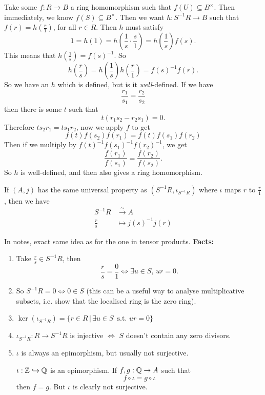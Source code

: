 \documentclass{article}
\begin{document}
\proof Take some $f : R \to B$ a ring homomorphism such that $f(U) \subseteq B^{\times}$. Then immediately, we know $f(S) \subseteq B^{\times}$. Then we want $h: S^{-1}R \to B$ such that $f(r) = h\left(\frac{r}{1}\right)$, for all $r \in R$. \gap Then $h$ must satisfy \[ 1=h(1)=h\left(\frac{1}{s} \cdot \frac{s}{1}\right) = h\left(\frac{1}{s}\right)f(s).\]
This means that $h\left(\frac{1}{s}\right) = f(s)^{-1}$. So \[ h\left(\frac{r}{s}\right)=h\left(\frac{1}{s}\right)h\left(\frac{r}{1}\right)=f(s)^{-1}f(r).\] So we have an $h$ which is defined, but is it \textit{well}-defined. If we have \[ \frac{r_{1}}{s_{1}}=\frac{r_{2}}{s_{2}}\] then there is some $t$ such that \[ t(r_{1}s_{2}-r_{2}s_{1}) = 0.\] Therefore $ts_{2}r_{1}=ts_{1}r_{2}$, now we apply $f$ to get \[ f(t)f(s_{2})f(r_{1})=f(t)f(s_{1})f(r_{2}) \] Then if we multiply by $f(t)^{-1}f(s_{1})^{-1}f(r_{2})^{-1}$, we get \[ \frac{f(r_{1})}{f(s_{1})}=\frac{f(r_{2})}{f(s_{2})}.\]
So $h$ is well-defined, and then also gives a ring homomorphism. \endproof
\begin{fancyprop}{}
    If $(A,j)$ has the same universal property as $(S^{-1}R, \iota_{S^{-1}R})$ where $\iota$ maps $r$ to $\frac{r}{1}$, then we have \begin{align*}
        S^{-1}R &\xrightarrow{\sim} A\\
        \frac{r}{s} &\mapsto j(s)^{-1}j(r)
    \end{align*}
\end{fancyprop}
\proof In notes, exact same idea as for the one in tensor products. \endproof \newpage
\textbf{Facts:} \begin{enumerate}
    \item Take $\frac{r}{s} \in S^{-1}R$, then \[ \frac{r}{s} = \frac{0}{1} \Leftrightarrow \exists u \in S, \, ur=0.\]
    \item So $S^{-1}R = 0 \Leftrightarrow 0 \in S$ (this can be a useful way to analyse multiplicative subsets, i.e. show that the localised ring is the zero ring).
    \item $\ker(\iota_{S^{-1}R}) = \{ r \in R \, | \, \exists u \in S \, \text{ s.t. } ur = 0\}$
    \item $\iota_{S^{-1}R} : R \to S^{-1}R$ is injective $\Leftrightarrow$ $S$ doesn't contain any zero divisors.
    \item $\iota$ is always an epimorphism, but usually not surjective. 
    \begin{ex*}
        $\iota: \mathbb{Z} \hookrightarrow \mathbb{Q}$ is an epimorphism. If $f, g : \mathbb{Q} \to A$ such that \[ f \circ \iota = g \circ \iota \] then $f=g$. But $\iota$ is clearly not surjective.
    \end{ex*}
\end{enumerate}
\end{document}
